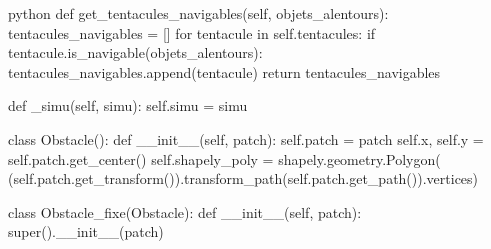 \begin{mintedbox}{python}
    def get_tentacules_navigables(self, objets_alentours):
        tentacules_navigables = []
        for tentacule in self.tentacules:
            if tentacule.is_navigable(objets_alentours):
                tentacules_navigables.append(tentacule)
        return tentacules_navigables

    def _simu(self, simu):
        self.simu = simu


class Obstacle():
    def __init__(self, patch):
        self.patch = patch
        self.x, self.y = self.patch.get_center()
        self.shapely_poly = shapely.geometry.Polygon(
            (self.patch.get_transform()).transform_path(self.patch.get_path()).vertices)


class Obstacle_fixe(Obstacle):
    def __init__(self, patch):
        super().__init__(patch)

\end{mintedbox}
